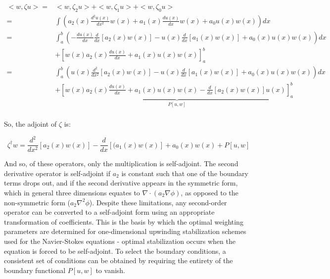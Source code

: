 \documentclass[10pt]{article}
\begin{document}
\begin{flushleft}
\begin{tcolorbox}[breakable]
\begin{equation}
\begin{aligned}
<w,\zeta u> = & <w, \zeta_2 u> + <w, \zeta_1 u> + <w, \zeta_0 u>\\
= & \int \left(a_2(x)\frac{d^2u(x)}{dx^2}w(x)+a_1(x)\frac{du(x)}{dx}w(x)+a_0u(x)w(x)\right)dx\\
= & \int_a^b \left(-\frac{du(x)}{dx}\frac{d}{dx}\left\lbrack a_2(x)w(x)\right\rbrack -u(x)\frac{d}{dx}\left\lbrack a_1(x)w(x)\right\rbrack + a_0(x)u(x)w(x)\right) dx\\ 
& + \left\lbrack w(x)a_2(x)\frac{du(x)}{dx}+a_1(x)u(x)w(x)\right\rbrack_a^b\\
= & \int_a^b \left(u(x)\frac{d^2}{dx^2}\left\lbrack a_2(x)w(x)\right\rbrack-u(x)\frac{d}{dx}\left\lbrack a_1(x)w(x)\right\rbrack + a_0(x)u(x)w(x)\right)dx\\
& + \underbrace{\left\lbrack w(x)a_2(x)\frac{du(x)}{dx}+a_1(x)u(x)w(x)-\frac{d}{dx}\left\lbrack a_2(x)w(x)\right\rbrack u(x)\right\rbrack_a^b}_{P[u,w]}\\
\end{aligned}
\end{equation}

So, the adjoint of \(\zeta\) is:

\begin{equation}
\zeta^\dagger w= \frac{d^2}{dx^2}\left\lbrack a_2(x)w(x)\right\rbrack -\frac{d}{dx}\left\lbrack(a_1(x)w(x)\right\rbrack+a_0(x)w(x)+P[u,w]
\end{equation}

And so, of these operators, only the multiplication is self-adjoint. The second derivative operator is self-adjoint if \(a_2\) is constant such that one of the boundary terms drops out, and if the second derivative appears in the symmetric form, which in general three dimensions equates to \(\nabla\cdot(a_2\nabla \phi)\), as opposed to the non-symmetric form (\(a_2\nabla^2 \phi\)). Despite these limitations, any second-order operator can be converted to a self-adjoint form using an appropriate transformation of coefficients. This is the basis by which the optimal weighting parameters are determined for one-dimensional upwinding stabilization schemes used for the Navier-Stokes equations - optimal stabilization occurs when the equation is forced to be self-adjoint. To select the boundary conditions, a consistent set of conditions can be obtained by requiring the entirety of the boundary functional \(P[u,w]\) to vanish. 
\end{tcolorbox}


\end{flushleft}
\end{document}
